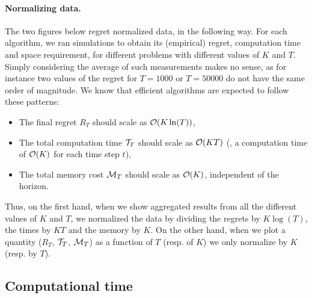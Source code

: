 \paragraph{Normalizing data.}
%
The two figures below regret normalized data, in the following way.
For each algorithm, we ran simulations to obtain its (empirical) regret, computation time and space requirement, for different problems with different values of $K$ and $T$.
Simply considering the average of such measurements makes no sense, as for instance two values of the regret for $T=1000$ or $T=50000$ do not have the same order of magnitude.
%
We know that efficient algorithms are expected to follow these patterns:
\begin{itemize}
    \item The final regret $R_T$ should scale as $\mathcal{O}(K \ln(T))$,
    \item The total computation time $\mathcal{T}_T$ should scale as $\mathcal{O}(K T)$ (\ie, a computation time of $\mathcal{O}(K)$ for each time step $t$),
    \item The total memory cost $\mathcal{M}_T$ should scale as $\mathcal{O}(K)$, independent of the horizon.
\end{itemize}
Thus, on the first hand, when we show aggregated results from all the different values of $K$ and $T$, we normalized the data by dividing the regrets by $K \log(T)$, the times by $K T$ and the memory by $K$.
%
On the other hand, when we plot a quantity ($R_T$, $\mathcal{T}_T$, $\mathcal{M}_T$) as a function of $T$ (resp. of $K$) we only normalize by $K$ (resp. by $T$).


\subsection{Computational time}


